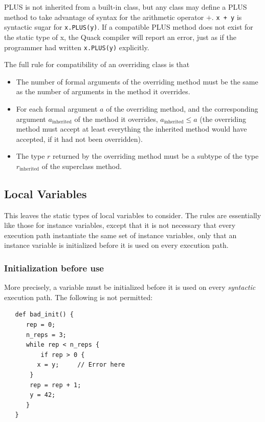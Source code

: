 \documentclass[11pt]{article}
\begin{document}
PLUS is not inherited from a built-in
class, but any class may define a PLUS method to take advantage of
syntax for the arithmetic operator $+$. \verb|x + y| is syntactic
sugar for \verb|x.PLUS(y)|.  If a compatible PLUS method does not
exist for the static type of x, the Quack compiler will report an
error, just as if the programmer had written \verb|x.PLUS(y)|
explicitly. 

\medbreak

\noindent The full rule for compatibility of an overriding class is that 

\begin{itemize}
  \item The number of formal arguments of the overriding method must be  
    the same as the number of arguments in the method it overrides. 
  \item For each formal argument $a$ of the overriding method, and the
    corresponding argument 
      \( a_{\mbox{inherited}} \) 
    of the method it
    overrides, 
   \( a_{\mbox{inherited}} \le a \)  (the overriding method must
    accept at least everything the inherited method would have
    accepted, if it had not been overridden).  
   \item The type $r$ returned by the overriding method must 
   be a subtype of the type $r_{\mbox{inherited}}$ of the 
   superclass method. 
\end{itemize}


\subsection{Local Variables} 


This leaves the static types of local variables to consider.  The
rules are essentially like those for instance variables, except that
it is not necessary that every execution path instantiate the same set
of instance variables, only that an instance variable is initialized
before it is used on every execution path. 

\subsubsection{Initialization before use}

 More precisely, a variable
must be initialized before it is used on every \emph{syntactic}
execution path.  The following is not permitted: 

\begin{verbatim}
   def bad_init() {
      rep = 0;
      n_reps = 3;
      while rep < n_reps {
          if rep > 0 {
	     x = y;     // Error here
	   }
	   rep = rep + 1;
	   y = 42;
      }
   }
\end{verbatim}
\end{document}

